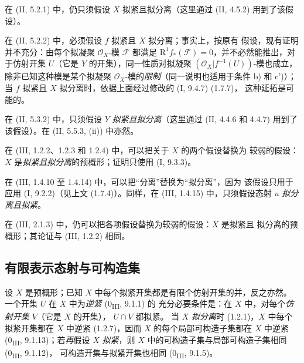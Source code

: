 \begin{env}[1.7.17]
\label{IV.1.7.17-fr}
在 (II, 5.2.1) 中，仍只须假设 $X$ 拟紧且拟分离（这里通过
(II, 4.5.2) 用到了该假设）。
\end{env}

\begin{env}[1.7.18]
\label{IV.1.7.18-fr}
在 (II, 5.2.2) 中，必须假设 $f$ 拟紧且 $X$ 拟分离；事实上，按原有
假设，现有证明并不充分：由每个拟凝聚 $\mathcal O_X$-模 $\mathcal F$
都满足 $\mathrm R^1f_*(\mathcal F)=0$，并不必然能推出，对于仿射开集
$U$（它是 $Y$ 的开集），同一性质对拟凝聚
$(\mathcal O_X|f^{-1}(U))$-模也成立，除非已知这种模是某个拟凝聚
$\mathcal O_X$-模的\emph{限制}（同一说明也适用于条件 b) 和 c')）；当
$f$ 拟紧且 $X$ 拟分离时，依据上面经过修改的 (I, 9.4.7) (1.7.7)，
这种延拓是可能的。
\end{env}

\begin{env}[1.7.19]
\label{IV.1.7.19-fr}
在 (II, 5.3.2) 中，只须假设 $Y$ \emph{拟紧且拟分离}（这里通过
(II, 4.4.6 和 4.4.7) 用到了该假设）。在 (II, 5.5.3, (ii)) 中亦然。
\end{env}

\begin{env}[1.7.20]
\label{IV.1.7.20-fr}
在 (III, 1.2.2、1.2.3 和 1.2.4) 中，可以把关于 $X$ 的两个假设替换为
较弱的假设：$X$ 是\emph{拟紧且拟分离}的预概形；证明只使用
(I, 9.3.3)。
\end{env}

\begin{env}[1.7.21]
\label{IV.1.7.21-fr}
在 (III, 1.4.10 至 1.4.14) 中，可以把“分离”替换为“拟分离”，因为
该假设只用于应用 (I, 9.2.2)（见上文 (1.7.4)）。同样，在
(III, 1.4.15) 中，只须假设态射 $u$ \emph{拟分离且拟紧}。
\end{env}

\begin{env}[1.7.22]
\label{IV.1.7.22-fr}
在 (III, 2.1.3) 中，仍可以把各项假设替换为较弱的假设：$X$ 是拟紧且
拟分离的预概形；其论证与 (III, 1.2.2) 相同。
\end{env}

\subsection{有限表示态射与可构造集}
\label{subsection:IV.1.8-fr}


\begin{env}[1.8.1]
\label{IV.1.8.1-fr}
设 $X$ 是预概形；已知 $X$ 中每个拟紧开集都是有限个仿射开集的并，反之亦然。
一个开集 $U$ 在 $X$ 中为\emph{逆紧} (0\textsubscript{III}, 9.1.1) 的
充分必要条件是：在 $X$ 中，对每个\emph{仿射开集} $V$（它是 $X$ 的开集），
$U\cap V$ 都拟紧。
当 $X$ \emph{拟分离}时 (1.2.1)，$X$ 中每个拟紧开集都在 $X$ 中逆紧
(1.2.7)，因而 $X$ 的每个局部可构造子集都在 $X$ 中逆紧
(0\textsubscript{III}, 9.1.13)；若\emph{再}假设 $X$ \emph{拟紧}，则
$X$ 中的可构造子集与局部可构造子集相同 (0\textsubscript{III}, 9.1.12)，
可构造开集与拟紧开集也相同 (0\textsubscript{III}, 9.1.5)。
\end{env}


